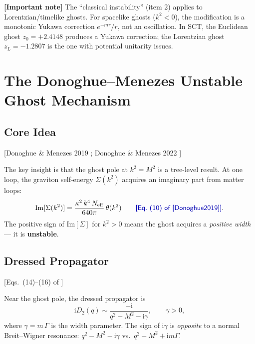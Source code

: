 \documentclass[11pt,a4paper]{article}
\theoremstyle{plain}
\theoremstyle{definition}
\theoremstyle{remark}
\newcommand{\ii}{\mathrm{i}}
\newcommand{\Neff}{N_{\mathrm{eff}}}
\newcommand{\fromlit}[1]{\textcolor{blue!70!black}{\textsf{[#1]}}}
\newcommand{\signcorrection}[1]{%
  \par\smallskip\noindent
  \colorbox{red!10}{\parbox{\dimexpr\linewidth-2\fboxsep}{%
    \textcolor{red!60!black}{\textbf{[Important note]}} #1}}%
  \par\smallskip}
\begin{document}
\signcorrection{The ``classical instability'' (item 2) applies to
Lorentzian/timelike ghosts.  For spacelike ghosts ($k^2 < 0$), the
modification is a monotonic Yukawa correction $e^{-mr}/r$, not an
oscillation.  In SCT, the Euclidean ghost $z_0 = +2.4148$ produces
a Yukawa correction; the Lorentzian ghost $z_L = -1.2807$ is the one
with potential unitarity issues.}


\section{The Donoghue--Menezes Unstable Ghost Mechanism}
\label{sec:donoghue}

\subsection{Core Idea}

\fromlit{Donoghue \& Menezes 2019 \cite{Donoghue2019};
Donoghue \& Menezes 2022 \cite{Donoghue2022}}

The key insight is that the ghost pole at $k^2 = M^2$ is a tree-level
result.  At one loop, the graviton self-energy $\Sigma(k^2)$ acquires an
imaginary part from matter loops:
\begin{equation}\label{eq:ImSigma}
  \mathrm{Im}[\Sigma(k^2)]
  = \frac{\kappa^2\,k^4\,\Neff}{640\pi}\,\theta(k^2)
  \qquad \fromlit{Eq.~(10) of \cite{Donoghue2019}}.
\end{equation}
The positive sign of $\mathrm{Im}[\Sigma]$ for $k^2 > 0$ means the
ghost acquires a \emph{positive width} --- it is \textbf{unstable}.

\subsection{Dressed Propagator}

\fromlit{Eqs.~(14)--(16) of \cite{Donoghue2022}}

Near the ghost pole, the dressed propagator is
\begin{equation}\label{eq:dressed}
  \ii D_2(q)
  \sim \frac{-\ii}{q^2 - M^2 - \ii\gamma},
  \qquad \gamma > 0,
\end{equation}
where $\gamma = m\,\Gamma$ is the width parameter.  The sign of
$\ii\gamma$ is \emph{opposite} to a normal Breit--Wigner resonance:
$q^2 - M^2 - \ii\gamma$ vs.\ $q^2 - M^2 + \ii m\Gamma$.
\end{document}
